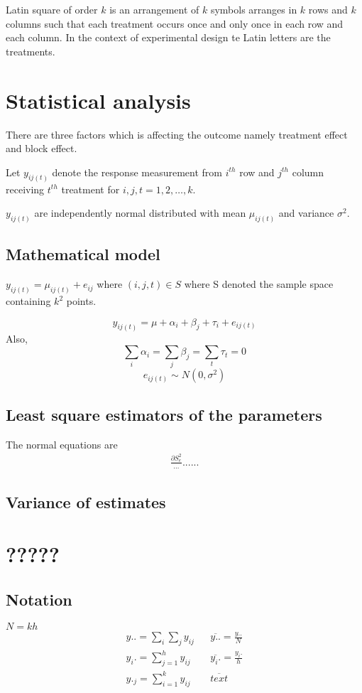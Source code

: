 \documentclass[oneside,11pt,pdftex]{book}%
\numberwithin{equation}{section}
\numberwithin{section}{chapter}
\numberwithin{equation}{chapter}
\begin{document}
Latin square of order $ k $ is an arrangement of $ k $ symbols arranges in $ k $ rows and $ k $ columns such that each treatment occurs once and only once in each row and each column. In the context of experimental design te Latin letters are the treatments.

\section{Statistical analysis}
There are three factors which is affecting the outcome namely treatment effect and block effect.

Let $ y_{ij(t)} $ denote the response measurement from $ i^{th} $ row and $ j^{th} $ column receiving $ t^{th} $ treatment for $ i,j,t=1,2,\dots,k $.

$ y_{ij(t)} $ are independently normal distributed with mean $ \mu_{ij(t)} $ and variance $ \sigma^2 $.

\subsection{Mathematical model}
$ y_{ij(t)}=\mu_{ij(t)}+e_{ij} $ where $ (i,j,t)\in S $ where S denoted the sample space containing $ k^2 $ points.

\[ y_{ij(t)}=\mu+\alpha_i+\beta_j+\tau_i+e_{ij(t)} \]
Also,
\[ \sum_i \alpha_i=\sum_j \beta_j=\sum_t \tau_t=0 \]
$$ e_{ij(t)} \sim N(0,\sigma^2) $$
\subsection{Least square estimators of the parameters}
The normal equations are 
\begin{align*}
	\frac{\partial S^2_e}{...}...
	...
\end{align*}

\subsection{Variance of estimates}

\section{?????}
\subsection{Notation}
$ N=kh $
\begin{align*}
	y..=\sum_i \sum_j y_{ij} && \overline{y..}=\frac{y..}{N}\\
	y_i.=\sum_{j=1}^h y_{ij} && \overline{y_i.}=\frac{y_i.}{h}\\
	y._j=\sum_{i=1}^k y_{ij} && \overline{text} 
\end{align*}
\end{document}

